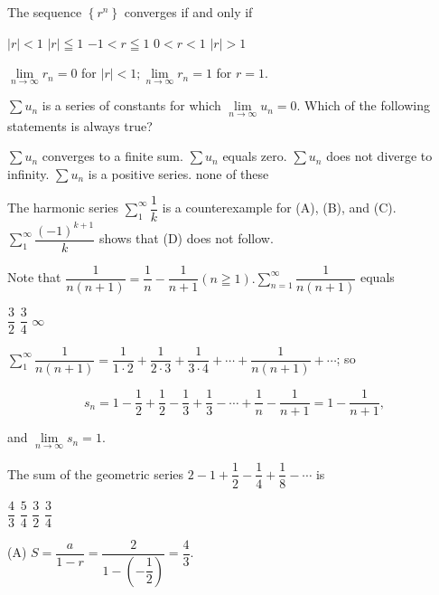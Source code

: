 \question
The sequence $\left\{r^{n}\right\}$ converges if and only if
\begin{choices}
  \choice $|r|<1$
  \choice $|r| \leqq 1$
  \CorrectChoice $-1<r \leqq 1$
  \choice $0<r<1$
  \choice $|r|>1$
\end{choices}
\begin{solution}
$\lim\limits_{n \to \infty} r_{n}=0$ for $|r|<1 ; \lim\limits_{n \to \infty} r_{n}=1$ for $r=1$.
\end{solution}

\question
$\sum u_{n}$ is a series of constants for which $\lim\limits_{n \to \infty} u_{n}=0$. Which of the following statements is always true?
\begin{choices}
  \choice $\sum u_{n}$ converges to a finite sum.
  \choice $\sum u_{n}$ equals zero.
  \choice $\sum u_{n}$ does not diverge to infinity.
  \choice $\sum u_{n}$ is a positive series.
  \CorrectChoice none of these
\end{choices}
\begin{solution}
The harmonic series $\sum\limits_{1}^{\infty} \dfrac{1}{k}$ is a counterexample for (A), (B), and (C). $\sum\limits_{1}^{\infty} \dfrac{(-1)^{k+1}}{k}$ shows that (D) does not follow.
\end{solution}




\newpage

 


\question
Note that $\dfrac{1}{n(n+1)}=\dfrac{1}{n}-\dfrac{1}{n+1}(n \geqq 1) . \sum\limits_{n=1}^{\infty} \dfrac{1}{n(n+1)}$ equals
\begin{choices}
  \choice $\dfrac{3}{2}$
  \choice $\dfrac{3}{4}$
  \choice $\infty$
\end{choices}
\begin{solution}
$\sum\limits_{1}^{\infty} \dfrac{1}{n(n+1)}=\dfrac{1}{1 \cdot 2}+\dfrac{1}{2 \cdot 3}+\dfrac{1}{3 \cdot 4}+\cdots+\dfrac{1}{n(n+1)}+\cdots$; so


\[
s_{n}=1-\dfrac{1}{2}+\dfrac{1}{2}-\dfrac{1}{3}+\dfrac{1}{3}-\cdots+\dfrac{1}{n}-\dfrac{1}{n+1}=1-\dfrac{1}{n+1},
\]

and $\lim\limits_{n \to \infty} s_{n}=1$.
\end{solution}

\question
The sum of the geometric series $2-1+\dfrac{1}{2}-\dfrac{1}{4}+\dfrac{1}{8}-\cdots$ is
\begin{choices}
  \CorrectChoice $\dfrac{4}{3}$
  \choice $\dfrac{5}{4}$
  \choice $\dfrac{3}{2}$
  \choice $\dfrac{3}{4}$
\end{choices}
\begin{solution}
(A) $S=\dfrac{a}{1-r}=\dfrac{2}{1-\left(-\dfrac{1}{2}\right)}=\dfrac{4}{3}$.
\end{solution}

